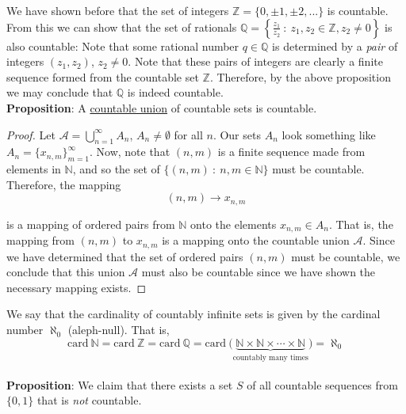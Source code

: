 \documentclass[12pt]{article}
\newlength\tindent
\renewcommand{\indent}{\hspace*{\tindent}}
\newcommand{\N}{\mathbb N}
\newcommand{\Z}{\mathbb Z}
\newcommand{\Q}{\mathbb Q}
\newcommand{\card}{\mathrm{card~}}
\begin{document}
\indent We have shown before that the set of integers $\Z = \{0, \pm 1, \pm 2, ...\}$ is countable. From this we can show that the set of rationals $\Q = \left\{ \frac{z_1}{z_2} ~:~ z_1, z_2 \in \Z, z_2 \neq 0 \right\}$ is also countable: Note that some rational number $q \in \Q$ is determined by a {\em pair} of integers $(z_1, z_2)$, $z_2 \neq 0$. Note that these pairs of integers are clearly a finite sequence formed from the countable set $\Z$. Therefore, by the above proposition we may conclude that $\Q$ is indeed countable. \\

{\bf Proposition}: A \underline{countable union} of countable sets is countable. 

\begin{proof} Let $\mathcal A = \bigcup^\infty_{n = 1} A_n$, $A_n \neq \emptyset$ for all $n$. Our sets $A_n$ look something like $A_n = \{x_{n,m}\}^\infty_{m = 1}$. Now, note that $(n,m)$ is a finite sequence made from elements in $\N$, and so the set of $\{(n,m) ~:~ n,m \in \N\}$ must be countable. Therefore, the mapping 
\begin{equation*}
	(n, m) \to x_{n,m}
\end{equation*}

is a mapping of ordered pairs from $\N$ onto the elements $x_{n,m} \in A_n$. That is, the mapping from $(n,m)$ to $x_{n,m}$ is a mapping onto the countable union $\mathcal A$. Since we have determined that the set of ordered pairs $(n,m)$ must be countable, we conclude that this union $\mathcal A$ must also be countable since we have shown the necessary mapping exists.
\end{proof} \hfill\newline

\indent We say that the cardinality of countably infinite sets is given by the cardinal number $\aleph_0$ (aleph-null). That is,
\begin{equation*}
	\card \N = \card \Z = \card \Q = \card \Big( \underbrace{ \N \times \N \times \cdots \times \N}_{\text{countably many times}} \Big) = \aleph_0
\end{equation*}
\\

{\bf Proposition}: We claim that there exists a set $S$ of all countable sequences from $\{0, 1\}$ that is {\em not} countable.
\end{document}

